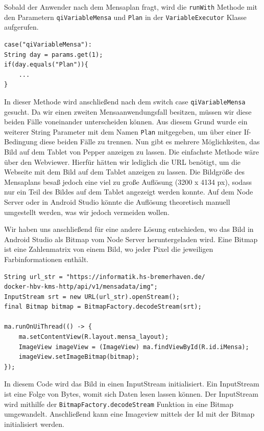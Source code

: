 Sobald der Anwender nach dem Mensaplan fragt, wird die \verb|runWith| Methode mit den Parametern \verb|qiVariableMensa|
und \verb|Plan| in der \verb|VariableExecutor| Klasse aufgerufen.\\

\begin{lstlisting}
case("qiVariableMensa"):
String day = params.get(1);
if(day.equals("Plan")){
    ...
}
\end{lstlisting}

In dieser Methode wird anschließend nach dem switch 
case \verb|qiVariableMensa| gesucht. Da wir einen zweiten Mensaanwendungsfall besitzen, müssen wir diese beiden Fälle 
voneinander unterscheiden können. Aus diesem Grund wurde ein weiterer String Parameter mit dem Namen \verb|Plan| mitgegeben, 
um über einer If-Bedingung diese beiden Fälle zu trennen. 
Nun gibt es mehrere Möglichkeiten, das Bild auf dem Tablet von Pepper anzeigen zu lassen. Die 
einfachste Methode wäre über den Webviewer. Hierfür hätten wir lediglich die URL benötigt, um die Webseite mit dem Bild auf dem 
Tablet anzeigen zu lassen. Die Bildgröße des Mensaplans besaß jedoch eine viel zu große Auflösung (3200 x 4134 px), sodass nur ein Teil des Bildes auf dem Tablet angezeigt werden konnte.
Auf dem Node Server oder in Android Studio könnte die Auflösung theoretisch manuell umgestellt werden, was wir jedoch vermeiden wollen. 

Wir haben uns anschließend für eine andere Lösung entschieden, wo das Bild in Android Studio als Bitmap vom Node Server heruntergeladen wird. Eine Bitmap 
ist eine Zahlenmatrix von einem Bild, wo jeder Pixel die jeweiligen Farbinformationen enthält.\\


\begin{lstlisting}
String url_str = "https://informatik.hs-bremerhaven.de/
docker-hbv-kms-http/api/v1/mensadata/img";
InputStream srt = new URL(url_str).openStream();
final Bitmap bitmap = BitmapFactory.decodeStream(srt);
    
ma.runOnUiThread(() -> {
    ma.setContentView(R.layout.mensa_layout);
    ImageView imageView = (ImageView) ma.findViewById(R.id.iMensa);
    imageView.setImageBitmap(bitmap);
});
\end{lstlisting}

In diesem Code wird das Bild in einen InputStream initialisiert. Ein InputStream ist eine Folge von Bytes, womit sich Daten lesen 
lassen können. Der InputStream wird mithilfe der \verb|BitmapFactory.decodeStream| Funktion in eine Bitmap umgewandelt. 
Anschließend kann eine Imageview mittels der Id mit der Bitmap initialisiert werden. 

